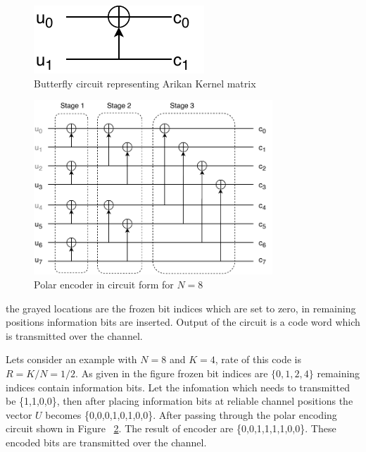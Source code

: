 \begin{figure}[h]
	\centering
	\includegraphics{./figures/ButterFlyCircuit.pdf}
	\caption{Butterfly circuit representing Arikan Kernel matrix}
	\label{fig:butterFlyCicuit}
\end{figure}


\begin{figure}[h]
	\centering
	\includegraphics[width=0.8\textwidth]{./figures/EncodingCircuitStages.pdf}
	\caption{Polar encoder in circuit form for $N = 8$}
	\label{fig:encoderCircuit}
\end{figure}

the grayed locations are the frozen bit indices which are set to zero, in remaining positions information bits are inserted. Output of the circuit is a code word which is transmitted over the channel.

Lets consider an example with $N = 8$ and $K = 4$, rate of this code is $R = K/N = 1/2$. As given in the figure frozen bit indices are ${\{0,1,2,4\}}$ remaining indices contain information bits.  Let the infomation which needs to transmitted be \{1,1,0,0\}, then after placing information bits at reliable channel positions the vector $U$ becomes \{0,0,0,1,0,1,0,0\}. After passing through the polar encoding circuit shown in Figure ~\ref{fig:encoderCircuit}. The result of encoder are \{0,0,1,1,1,1,0,0\}. These encoded bits are transmitted over the channel.

